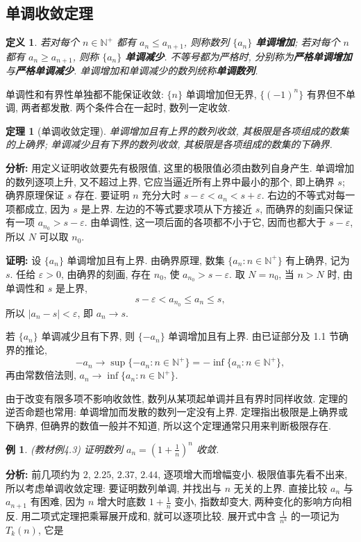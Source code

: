 \documentclass[UTF8,openany]{ctexbook}
\theoremstyle{chinesetextbook}
\newtheorem{definition}{定义}[section]
\newtheorem{example}{例}[section]
\newtheorem{theorem}{定理}[section]
\newenvironment{cnproof}{\par\indent\textbf{证明:} \ignorespaces}{\par}
\begin{document}
\subsection{单调收敛定理}
\begin{definition}
若对每个 $n\in\mathbb N^+$ 都有 $a_n\le a_{n+1}$, 则称数列 $\{a_n\}$ \textbf{单调增加}; 若对每个 $n$ 都有 $a_n\ge a_{n+1}$, 则称 $\{a_n\}$ \textbf{单调减少}. 不等号都为严格时, 分别称为\textbf{严格单调增加}与\textbf{严格单调减少}. 单调增加和单调减少的数列统称\textbf{单调数列}.
\end{definition}
单调性和有界性单独都不能保证收敛: $\{n\}$ 单调增加但无界, $\{(-1)^n\}$ 有界但不单调, 两者都发散. 两个条件合在一起时, 数列一定收敛.
\begin{theorem}[单调收敛定理]
单调增加且有上界的数列收敛, 其极限是各项组成的数集的上确界; 单调减少且有下界的数列收敛, 其极限是各项组成的数集的下确界.
\end{theorem}
\par\indent\textbf{分析:} 用定义证明收敛要先有极限值, 这里的极限值必须由数列自身产生. 单调增加的数列逐项上升, 又不超过上界, 它应当逼近所有上界中最小的那个, 即上确界 $s$; 确界原理保证 $s$ 存在. 要证明 $n$ 充分大时 $s-\varepsilon<a_n<s+\varepsilon$. 右边的不等式对每一项都成立, 因为 $s$ 是上界. 左边的不等式要求项从下方接近 $s$, 而确界的刻画只保证有一项 $a_{n_0}>s-\varepsilon$. 由单调性, 这一项后面的各项都不小于它, 因而也都大于 $s-\varepsilon$, 所以 $N$ 可以取 $n_0$.
\begin{cnproof}
设 $\{a_n\}$ 单调增加且有上界. 由确界原理, 数集 $\{a_n:n\in\mathbb N^+\}$ 有上确界, 记为 $s$. 任给 $\varepsilon>0$, 由确界的刻画, 存在 $n_0$, 使 $a_{n_0}>s-\varepsilon$. 取 $N=n_0$, 当 $n>N$ 时, 由单调性和 $s$ 是上界,
\[
s-\varepsilon<a_{n_0}\le a_n\le s,
\]
所以 $|a_n-s|<\varepsilon$, 即 $a_n\to s$.

若 $\{a_n\}$ 单调减少且有下界, 则 $\{-a_n\}$ 单调增加且有上界. 由已证部分及 1.1 节确界的推论,
\[
-a_n\to\sup\{-a_n:n\in\mathbb N^+\}=-\inf\{a_n:n\in\mathbb N^+\},
\]
再由常数倍法则, $a_n\to\inf\{a_n:n\in\mathbb N^+\}$.
\end{cnproof}
由于改变有限多项不影响收敛性, 数列从某项起单调并且有界时同样收敛. 定理的逆否命题也常用: 单调增加而发散的数列一定没有上界. 定理指出极限是上确界或下确界, 但确界的数值一般并不知道, 所以这个定理通常只用来判断极限存在.
\begin{example}\label{ex:4-3}
\textnormal{(教材例4.3)} 证明数列 $\displaystyle a_n=\left(1+\frac1n\right)^n$ 收敛.
\end{example}
\par\indent\textbf{分析:} 前几项约为 $2$, $2.25$, $2.37$, $2.44$, 逐项增大而增幅变小. 极限值事先看不出来, 所以考虑单调收敛定理: 要证明数列单调, 并找出与 $n$ 无关的上界. 直接比较 $a_n$ 与 $a_{n+1}$ 有困难, 因为 $n$ 增大时底数 $\displaystyle1+\frac1n$ 变小, 指数却变大, 两种变化的影响方向相反. 用二项式定理把乘幂展开成和, 就可以逐项比较. 展开式中含 $\displaystyle\frac1{n^k}$ 的一项记为 $T_k(n)$, 它是
\end{document}
